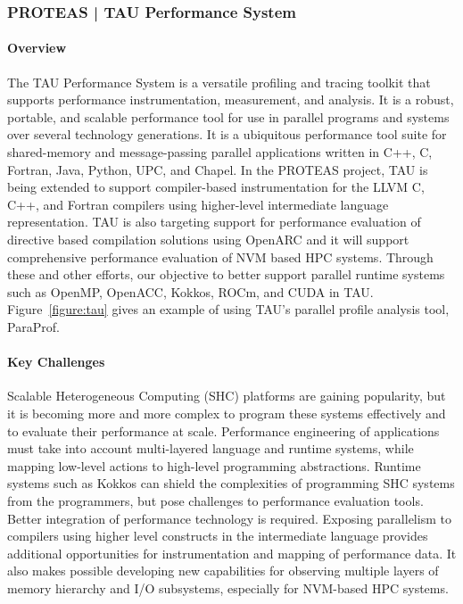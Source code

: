 \subsubsection{ PROTEAS | TAU Performance System}\label{subsubsect:tau}

\paragraph{Overview} 
The TAU Performance System is a versatile profiling and tracing toolkit that supports performance instrumentation, measurement, and analysis. It is a robust, portable, and scalable performance tool for use in parallel programs and systems over several technology generations. It is a ubiquitous performance tool suite for shared-memory and message-passing parallel applications written in C++, C, Fortran, Java, Python, UPC, and Chapel. In the PROTEAS project, TAU is being extended to support compiler-based instrumentation for the LLVM C, C++, and Fortran compilers using higher-level intermediate language representation. TAU is also targeting support for performance evaluation of directive based compilation solutions using OpenARC and it will support comprehensive performance evaluation of NVM based HPC systems.  Through these and other efforts, our objective to better support parallel runtime systems such as OpenMP, OpenACC, Kokkos, ROCm, and CUDA in TAU. Figure~\ref{figure:tau} gives an example of using TAU's parallel profile analysis tool, ParaProf.

\paragraph{Key Challenges} 
Scalable Heterogeneous Computing (SHC) platforms are gaining popularity, but it is becoming more and more complex to program these systems effectively and to evaluate their performance at scale. Performance engineering of applications must take into account multi-layered language and runtime systems, while mapping low-level actions to high-level programming abstractions.  Runtime systems such as Kokkos can shield the complexities of programming SHC systems from the programmers, but pose challenges to performance evaluation tools.  Better integration of performance technology is required.  Exposing parallelism to compilers using higher level constructs in the intermediate language provides additional opportunities for instrumentation and mapping of performance data.  It also makes possible developing new capabilities for observing multiple layers of memory hierarchy and I/O subsystems, especially for NVM-based HPC systems. 

